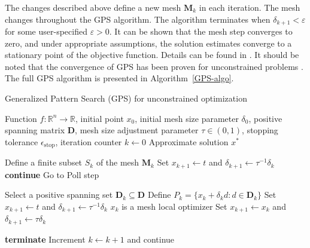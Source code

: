 The changes described above define a new mesh $ \mathbf{M} _k $ in each iteration. The mesh changes throughout the GPS algorithm. The algorithm terminates when $ \delta_{k+1} < \varepsilon $ for some user-specified $ \varepsilon > 0 $. It can be shown that the mesh step converges to zero, and under appropriate assumptions, the solution estimates converge to a stationary point of the objective function. Details can be found in \cite{BBO-textbook}. It should be noted that the convergence of GPS has been proven for unconstrained problems \cite{BBO-textbook}. The full GPS algorithm is presented in Algorithm~\ref{GPS-algo}.
\\[4pt]
\begin{algorithm}[H]
	\caption{Generalized Pattern Search (GPS) for unconstrained optimization}\label{GPS-algo}
	\begin{algorithmic}[1]
		\Require Function $f: \mathbb{R}^n \to \mathbb{R}$, initial point $x_0$, initial mesh size parameter $\delta_0$, positive spanning matrix $\mathbf{D}$, mesh size adjustment parameter $\tau \in (0, 1)$, stopping tolerance $\epsilon_{\text{stop}}$, iteration counter $k \gets 0$
		\Ensure Approximate solution $x^*$
		
		
		
		\State Define a finite subset $S_k$ of the mesh $\mathbf{M}_k$
		\State Set $x_{k+1} \gets t$ and $\delta_{k+1} \gets \tau^{-1} \delta_k$
		\State \textbf{continue}
		\Else
		\State Go to Poll step
		\EndIf
		
		\State Select a positive spanning set $\mathbf{D}_k \subseteq \mathbf{D}$
		\State Define $P_k = \{x_k + \delta_k d : d \in \mathbf{D}_k\}$
		\State Set $x_{k+1} \gets t$ and $\delta_{k+1} \gets \tau^{-1} \delta_k$
		\Else
		\State $x_k$ is a mesh local optimizer
		\State Set $x_{k+1} \gets x_k$ and $\delta_{k+1} \gets \tau \delta_k$
		\EndIf
		
		\State \textbf{terminate}
		\Else
		\State Increment $k \gets k+1$ and continue
		\EndIf
		
		\EndWhile
		\EndProcedure
	\end{algorithmic}
\end{algorithm}

